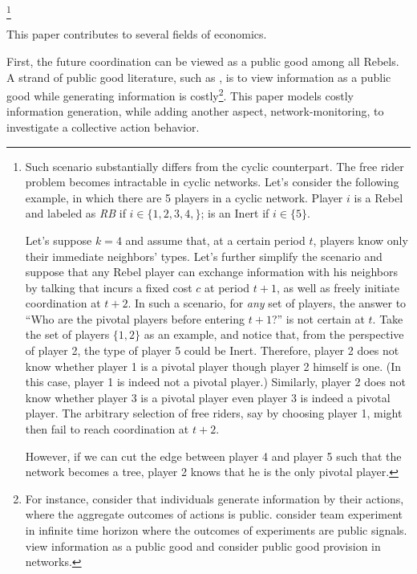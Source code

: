 \documentclass[12pt,letter]{article}
\theoremstyle{definition}
\theoremstyle{remark}
\theoremstyle{claim}
\begin{document}
\footnote{
Such scenario substantially differs from the cyclic counterpart. The free rider problem becomes intractable in cyclic networks. Let's consider the following example, in which there are 5 players in a cyclic network. Player $i$ is a Rebel and labeled as \textit{RB} if $i\in\{1,2,3,4,\}$; is an Inert if $i\in\{5\}$.

\begin{center}
\end{center}

Let's suppose $k=4$ and assume that, at a certain period $t$, players know only their immediate neighbors' types. Let's further simplify the scenario and suppose that any Rebel player can exchange information with his neighbors by talking that incurs a fixed cost $c$ at period $t+1$, as well as freely initiate coordination at $t+2$. In such a scenario, for \textit{any} set of players, the answer to ``Who are the pivotal players before entering $t+1$?'' is not certain at $t$. Take the set of players $\{1,2\}$ as an example, and notice that, from the perspective of player 2, the type of player 5 could be Inert. Therefore, player 2 does not know whether player 1 is a pivotal player though player 2 himself is one. (In this case, player 1 is indeed not a pivotal player.) Similarly, player 2 does not know whether player 3 is a pivotal player even player 3 is indeed a pivotal player. The arbitrary selection of free riders, say by choosing player 1, might then fail to reach coordination at $t+2$. 

However, if we can cut the edge between player 4 and player 5 such that the network becomes a tree, player 2 knows that he is the only pivotal player.
}





This paper contributes to several fields of economics. 

First, the future coordination can be viewed as a public good among all Rebels. A strand of public good literature, such as \citep{Lohmann1994}, is to view information as a public good while generating information is costly\footnote{For instance, \citep{Lohmann1993}\citep{Lohmann1994} consider that individuals generate information by their actions, where the aggregate outcomes of actions is public. \citep{Bolto_Harris1999} consider team experiment in infinite time horizon where the outcomes of experiments are public signals. \citep{Bramoulle2007} view information as a public good and consider public good provision in networks.}. This paper models costly information generation, while adding another aspect, network-monitoring, to investigate a collective action behavior.
\end{document}
